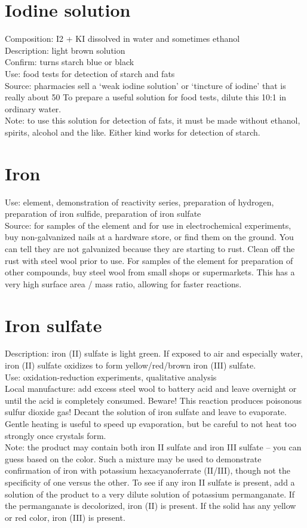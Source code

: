\section{Iodine solution}
Composition: I2 + KI dissolved in water and sometimes ethanol\\
Description: light brown solution\\
Confirm: turns starch blue or black\\
Use: food tests for detection of starch and fats\\
Source: pharmacies sell a ‘weak iodine solution’ 
or ‘tincture of iodine’ that is really about 50%
To prepare a useful solution for food tests, 
dilute this 10:1 in ordinary water.\\
Note: to use this solution for detection of fats, 
it must be made without ethanol, 
spirits, 
alcohol and the like. 
Either kind works for detection of starch.

\section{Iron}
Use: element, 
demonstration of reactivity series, 
preparation of hydrogen, 
preparation of iron sulfide, 
preparation of iron sulfate\\
Source: for samples of the element 
and for use in electrochemical experiments, 
buy non-galvanized nails at a hardware store, 
or find them on the ground. 
You can tell they are not galvanized because they are starting to rust. 
Clean off the rust with steel wool prior to use. 
For samples of the element for preparation of other compounds, 
buy steel wool from small shops or supermarkets. 
This has a very high surface area / mass ratio, 
allowing for faster reactions.

\section{Iron sulfate}
Description: iron (II) sulfate is light green. 
If exposed to air and especially water, 
iron (II) sulfate oxidizes to form yellow/red/brown iron (III) sulfate.\\
Use: oxidation-reduction experiments, 
qualitative analysis\\
Local manufacture: add excess steel wool to battery acid 
and leave overnight or until the acid is completely consumed. 
Beware! This reaction produces poisonous sulfur dioxide gas! 
Decant the solution of iron sulfate and leave to evaporate. 
Gentle heating is useful to speed up evaporation, 
but be careful to not heat too strongly once crystals form.\\
Note: the product may contain both iron II sulfate and iron III sulfate – 
you can guess based on the color. 
Such a mixture may be used to demonstrate confirmation of iron 
with potassium hexacyanoferrate (II/III), 
though not the specificity of one versus the other. 
To see if any iron II sulfate is present, 
add a solution of the product 
to a very dilute solution of potassium permanganate. 
If the permanganate is decolorized, 
iron (II) is present. 
If the solid has any yellow or red color, 
iron (III) is present.

